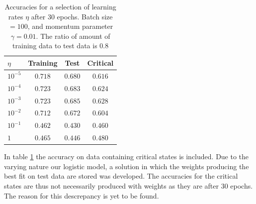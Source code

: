 \begin{table}[H]
\center
\begin{tabular}{l|c|c|c}
$\eta$ & Training & Test & Critical  \\
\hline
$10^{-5}$ & $0.718$ & $0.680$ & $0.616$ \\
$10^{-4}$ & $0.723$ & $0.683$ & $0.624$ \\
$10^{-3}$ & $0.723$ & $0.685$ & $0.628$ \\
$10^{-2}$ & $0.712$ & $0.672$ & $0.604$ \\
$10^{-1}$ & $0.462$ & $0.430$ & $0.460$ \\
$1$    & $0.465$ & $0.446$ & $0.480$
\end{tabular}
    \caption{Accuracies for a selection of learning rates $\eta$ after 
    30 epochs. Batch size $= 100$, and momentum parameter $\gamma = 0.01$.
    The ratio of amount of training data to test data is $0.8$}
    \label{tab:logistic-critical}
\end{table}
In table \ref{tab:logistic-critical} the accuracy on data containing critical states
is included. Due to the varying nature our logistic model, a solution in which the weights
producing the best fit on test data are stored was developed. The accuracies for the critical
states are thus not necessarily produced with weights as they are after 30 epochs. The reason for this descrepancy is yet to be found.

